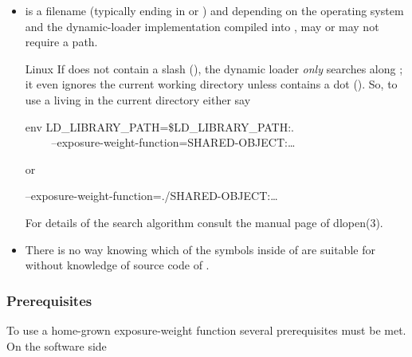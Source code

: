 \begin{itemize}
         {environment variable, }%
\item
   is a filename (typically ending in  or )
  and depending on the operating system and the dynamic-loader implementation compiled into
  \App{},  may or may not require a path.

  \begin{restrictedmaterial}{Linux}
    If  does not contain a slash (\sample{/}), the dynamic loader
    \emph{only} searches along ; it even ignores the current working
    directory unless  contains a dot ().  So, to use a
     living in the current directory either say
    \begin{literal}
      env LD\_LIBRARY\_PATH=\$LD\_LIBRARY\_PATH:. \bslash \\
      ~~~~\app{} --exposure-weight-function=\feasiblebreak SHARED-OBJECT:\dots
    \end{literal}
    or
    \begin{literal}
      \app{} --exposure-weight-function=\feasiblebreak ./SHARED-OBJECT:\dots
    \end{literal}

    For details of the search algorithm consult the manual page of dlopen(3).
  \end{restrictedmaterial}

\item
  There is no way knowing which of the symbols inside of  are suitable
  for  without knowledge of source code of .
\end{itemize}


\subsubsection[Prerequisites]{\label{sec:prerequisites}%
  Prerequisites}

To use a home-grown exposure-weight function several prerequisites must be met.  On the software
side

